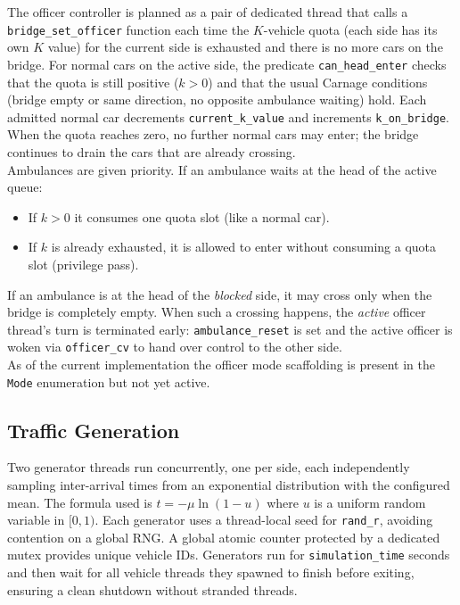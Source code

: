 \documentclass[12pt]{article}
\begin{document}
The officer controller is planned as a pair of dedicated thread that calls a \texttt{bridge\_set\_officer} function each time the $K$-vehicle quota
(each side has its own $K$ value) for the current side is exhausted and there is no more cars on the bridge. 
For normal cars on the active side, the predicate \texttt{can\_head\_enter} checks that the quota is still positive ($k>0$) and that the usual Carnage conditions (bridge empty or same direction, no opposite ambulance waiting)
hold. Each admitted normal car decrements \texttt{current\_k\_value} and increments \texttt{k\_on\_bridge}. When the quota reaches zero, no further normal cars may enter; the bridge continues to drain the cars that are already crossing.
\\
Ambulances are given priority. If an ambulance waits at the head of the active queue: 
\begin{itemize}
\item If $k>0$ it consumes one quota slot (like a normal car).
\item If $k$ is already exhausted, it is allowed to enter without consuming a quota slot (privilege pass).
\end{itemize}
If an ambulance is at the head of the \emph{blocked} side, it may cross only when the bridge is completely empty. When such a crossing happens, the \emph{active} officer thread’s turn is terminated early: \texttt{ambulance\_reset} is set and the active officer is woken via \texttt{officer\_cv} to hand over control to the other side.
\\
As of the current implementation the officer mode scaffolding is present in
the \texttt{Mode} enumeration but not yet active.

\subsection{Traffic Generation}

Two generator threads run concurrently, one per side, each independently
sampling inter-arrival times from an exponential distribution with the
configured mean. The formula used is $t = -\mu \ln(1 - u)$ where $u$ is a
uniform random variable in $[0,1)$. Each generator uses a thread-local
seed for \texttt{rand\_r}, avoiding contention on a global RNG. A global
atomic counter protected by a dedicated mutex provides unique vehicle IDs.
Generators run for \texttt{simulation\_time} seconds and then wait for all
vehicle threads they spawned to finish before exiting, ensuring a clean
shutdown without stranded threads.
\end{document}
